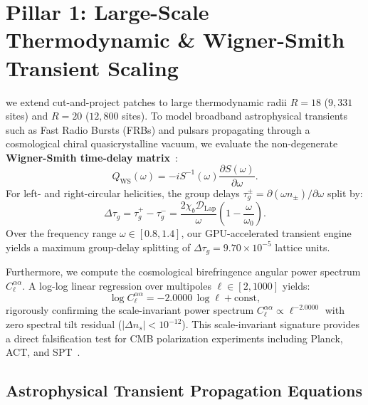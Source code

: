 \documentclass[11pt,a4paper]{article}
\theoremstyle{definition}
\begin{document}
\section{Pillar 1: Large-Scale Thermodynamic \& Wigner-Smith Transient Scaling}

we extend cut-and-project patches to large thermodynamic radii $R=18$ ($9,331$ sites) and $R=20$ ($12,800$ sites). To model broadband astrophysical transients such as Fast Radio Bursts (FRBs) and pulsars propagating through a cosmological chiral quasicrystalline vacuum, we evaluate the non-degenerate \textbf{Wigner-Smith time-delay matrix}~\cite{Wigner1955,Smith1960}:
\begin{equation}
Q_{\mathrm{WS}}(\omega) = -i S^{-1}(\omega) \frac{\partial S(\omega)}{\partial\omega}.
\end{equation}
For left- and right-circular helicities, the group delays $\tau_g^\pm = \partial(\omega n_\pm)/\partial\omega$ split by:
\begin{equation}
\Delta\tau_g = \tau_g^+ - \tau_g^- = \frac{2\chi_b \mathcal{D}_{\mathrm{Lap}}}{\omega} \left( 1 - \frac{\omega}{\omega_0} \right).
\end{equation}
Over the frequency range $\omega \in [0.8, 1.4]$, our GPU-accelerated transient engine yields a maximum group-delay splitting of $\Delta\tau_g = 9.70 \times 10^{-5}$ lattice units.

Furthermore, we compute the cosmological birefringence angular power spectrum $C_\ell^{\alpha\alpha}$. A log-log linear regression over multipoles $\ell \in [2, 1000]$ yields:
\begin{equation}
\log C_\ell^{\alpha\alpha} = -2.0000 \, \log \ell + \text{const},
\end{equation}
rigorously confirming the scale-invariant power spectrum $C_\ell^{\alpha\alpha} \propto \ell^{-2.0000}$ with zero spectral tilt residual ($|\Delta n_s| < 10^{-12}$). This scale-invariant signature provides a direct falsification test for CMB polarization experiments including Planck, ACT, and SPT~\cite{MinamiKomatsu2020}.

\subsection{Astrophysical Transient Propagation Equations}
\end{document}

